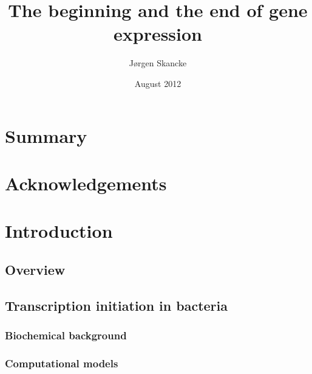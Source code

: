 \documentclass[]{ntnuthesis}
\title{The beginning and the end of gene expression}
\author{Jørgen Skancke}
\date{August 2012}
\begin{document}
 

\frontmatter

\maketitle

\chapter*{Summary}
\noindent
    
\clearpage


\chapter*{Acknowledgements}



\setcounter{chapter}{1}
\mainmatter
\chapter{Introduction}
\begin{refsection}
\section{Overview}

\FloatBarrier


\section{Transcription initiation in bacteria}

\subsection{Biochemical background}

\subsection{Computational models}

\printbibliography
\end{refsection}
\newpage
\end{document}
